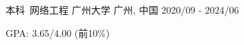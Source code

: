 

\begin{cventries}

  \cventry
    {本科\ 网络工程} %
    {广州大学} %
    {广州, 中国} %
    {2020/09 - 2024/06} %
    {
      \begin{cvitems} %
        \item {GPA: 3.65/4.00 (前10\%)}
      \end{cvitems}
    }

\end{cventries}
